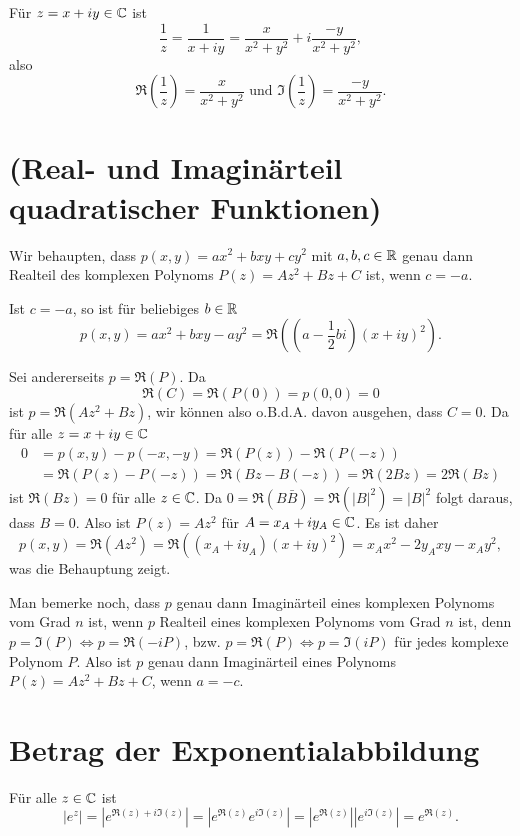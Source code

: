 \documentclass[a4paper,10pt]{article}
\begin{document}
Für $z = x+iy \in \mathbb{C}$ ist
\[
 \frac{1}{z} = \frac{1}{x+iy} = \frac{x}{x^2+y^2} + i\frac{-y}{x^2+y^2},
\]
also
\[
 \Re\left(\frac{1}{z}\right) = \frac{x}{x^2+y^2} \text{ und }
 \Im\left(\frac{1}{z}\right) = \frac{-y}{x^2+y^2}.
\]











\section{(Real- und Imaginärteil quadratischer Funktionen)}
Wir behaupten, dass $p(x,y) = ax^2 + bxy + cy^2$ mit $a,b,c \in \mathbb{R}$ genau dann Realteil des komplexen Polynoms $P(z) = Az^2 + Bz + C$ ist, wenn $c = -a$.

Ist $c = -a$, so ist für beliebiges $b \in \mathbb{R}$
\[
 p(x,y) = ax^2 + bxy - ay^2 = \Re\left(\left(a-\frac{1}{2}bi\right)(x+iy)^2\right).
\]

Sei andererseits $p = \Re(P)$. Da
\[
 \Re(C) = \Re(P(0)) = p(0,0) = 0
\]
ist $p = \Re(Az^2+Bz)$, wir können also o.B.d.A. davon ausgehen, dass $C=0$. Da für alle $z = x+iy \in \mathbb{C}$
\begin{align*}
 0 &= p(x,y) - p(-x,-y) = \Re(P(z))-\Re(P(-z)) \\
   &= \Re(P(z)-P(-z)) = \Re(Bz - B(-z)) = \Re(2Bz) = 2 \Re(Bz)
\end{align*}
ist $\Re(Bz) = 0$ für alle $z \in \mathbb{C}$. Da $0 = \Re(B \bar{B}) = \Re(|B|^2)= |B|^2$ folgt daraus, dass $B = 0$. Also ist $P(z) = Az^2$ für $A = x_A + iy_A \in \mathbb{C}$. Es ist daher
\[
 p(x,y) = \Re(Az^2) = \Re((x_A+iy_A)(x+iy)^2) = x_Ax^2 - 2y_Axy - x_A y^2,
\]
was die Behauptung zeigt.

Man bemerke noch, dass $p$ genau dann Imaginärteil eines komplexen Polynoms vom Grad $n$ ist, wenn $p$ Realteil eines komplexen Polynoms vom Grad $n$ ist, denn $p = \Im(P) \Leftrightarrow p = \Re(-iP)$, bzw. $p = \Re(P) \Leftrightarrow p = \Im(iP)$ für jedes komplexe Polynom $P$. Also ist $p$ genau dann Imaginärteil eines Polynoms $P(z) = Az^2+Bz+C$, wenn $a = -c$.





\section{Betrag der Exponentialabbildung}
Für alle $z \in \mathbb{C}$ ist
\[
 |e^z| = \left|e^{\Re(z)+i\Im(z)}\right| = \left|e^{\Re(z)} e^{i\Im(z)}\right|
 = \left|e^{\Re(z)}\right| \left|e^{i\Im(z)}\right| = e^{\Re(z)}.
\]
\end{document}
